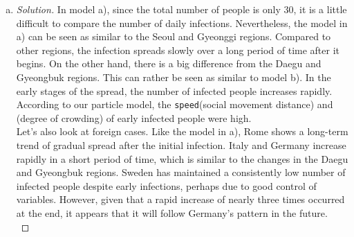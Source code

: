 \begin{enumerate} [a)]
\begin{proof} [Solution]
\begin{figure}
			\end{figure}
			Differential equation models are based on theoretical formulas. Infection and recovery occur numerically according to the social distance $\beta$ and recovery rate $\gamma$. This is advantageous in explaining the long-term spread trend of infectious diseases, but may not properly reflect local reality.\\
			The particle model takes into account social movement: distance and speed. Therefore, the number of infected and recovered people each day is not consistent. This is advantageous for simulated observations based on reality, but it may be difficult to calculate long-term trends due to the complexity of calculations and various variables.\\
		\end{proof}
		\item 
		\begin{proof} [Solution]
			In model a), since the total number of people is only 30, it is a little difficult to compare the number of daily infections. Nevertheless, the model in a) can be seen as similar to the Seoul and Gyeonggi regions. Compared to other regions, the infection spreads slowly over a long period of time after it begins. On the other hand, there is a big difference from the Daegu and Gyeongbuk regions. This can rather be seen as similar to model b). In the early stages of the spread, the number of infected people increases rapidly. According to our particle model, the \texttt{speed}(social movement distance) and (degree of crowding) of early infected people were high.\\
			Let’s also look at foreign cases. Like the model in a), Rome shows a long-term trend of gradual spread after the initial infection. Italy and Germany increase rapidly in a short period of time, which is similar to the changes in the Daegu and Gyeongbuk regions. Sweden has maintained a consistently low number of infected people despite early infections, perhaps due to good control of variables. However, given that a rapid increase of nearly three times occurred at the end, it appears that it will follow Germany's pattern in the future.\\
		\end{proof}
	\end{enumerate}